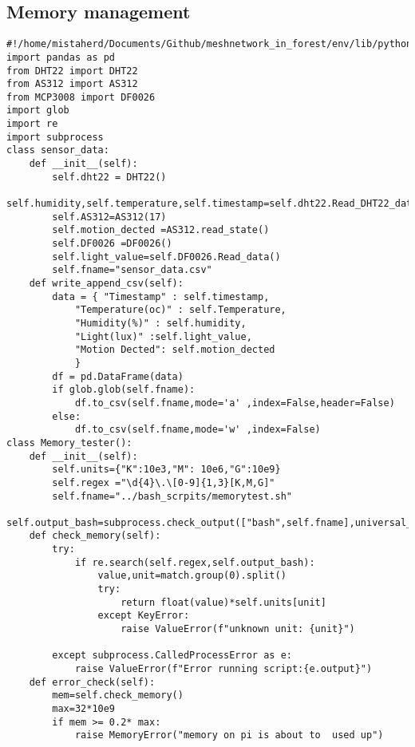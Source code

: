 \subsection{Memory management}
\begin{lstlisting}[style=mystyle,caption={Code for  memory mangement}]
#!/home/mistaherd/Documents/Github/meshnetwork_in_forest/env/lib/python3.11
import pandas as pd
from DHT22 import DHT22
from AS312 import AS312
from MCP3008 import DF0026
import glob
import re 
import subprocess
class sensor_data:
	def __init__(self):
		self.dht22 = DHT22()
		self.humidity,self.temperature,self.timestamp=self.dht22.Read_DHT22_data()
		self.AS312=AS312(17)
		self.motion_dected =AS312.read_state()
		self.DF0026 =DF0026()
		self.light_value=self.DF0026.Read_data()
		self.fname="sensor_data.csv"
	def write_append_csv(self):
		data = { "Timestamp" : self.timestamp,
			"Temperature(oc)" : self.Temperature,
			"Humidity(%)" : self.humidity,
			"Light(lux)" :self.light_value,
			"Motion Dected": self.motion_dected
			}
		df = pd.DataFrame(data)
		if glob.glob(self.fname):	
			df.to_csv(self.fname,mode='a' ,index=False,header=False)
		else:
			df.to_csv(self.fname,mode='w' ,index=False)
class Memory_tester():
	def __init__(self):
		self.units={"K":10e3,"M": 10e6,"G":10e9}
		self.regex ="\d{4}\.\[0-9]{1,3}[K,M,G]"
		self.fname="../bash_scrpits/memorytest.sh" 
		self.output_bash=subprocess.check_output(["bash",self.fname],universal_newlines=True)
	def check_memory(self):
		try:
			if re.search(self.regex,self.output_bash):
				value,unit=match.group(0).split()
				try:
					return float(value)*self.units[unit]
				except KeyError:
					raise ValueError(f"unknown unit: {unit}")
			
		except subprocess.CalledProcessError as e:
			raise ValueError(f"Error running script:{e.output}")
	def error_check(self):
		mem=self.check_memory()
		max=32*10e9
		if mem >= 0.2* max:
			raise MemoryError("memory on pi is about to  used up")		
\end{lstlisting}
